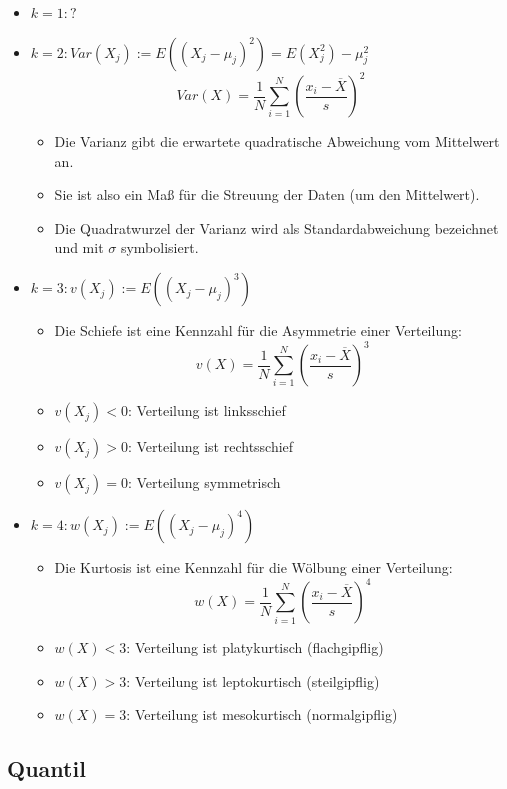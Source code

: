 \documentclass{scrartcl}
\begin{document}
\begin{itemize}
	\item $ k=1:? $
	\item $ k=2:Var(X_j) := E((X_j - \mu_j)^2) = E(X_j^2) - \mu_j^2 $
	\[ Var(X) = \frac{1}{N} \sum_{i=1}^{N} (\frac{x_i - \overline{X}}{s})^2 \]
	\begin{itemize}
		\item Die Varianz gibt die erwartete quadratische Abweichung vom 
		Mittelwert an.
		\item Sie ist also ein Maß für die Streuung der Daten (um den 
		Mittelwert).
		\item Die Quadratwurzel der Varianz wird als Standardabweichung 
		bezeichnet und mit $ \sigma $ symbolisiert.
	\end{itemize}
	\item $ k=3:v(X_j) := E((X_j - \mu_j)^3) $
	\begin{itemize}
		\item Die Schiefe ist eine Kennzahl für die Asymmetrie einer Verteilung:
		\[ v(X) = \frac{1}{N} \sum_{i=1}^{N} (\frac{x_i - \overline{X}}{s})^3 \]
		\item $ v(X_j) < 0 $: Verteilung ist linksschief
		\item $ v(X_j) > 0 $: Verteilung ist rechtsschief
		\item $ v(X_j) = 0 $: Verteilung symmetrisch
	\end{itemize}
	\item $ k=4:w(X_j) := E((X_j - \mu_j)^4) $
	\begin{itemize}
		\item Die Kurtosis ist eine Kennzahl für die Wölbung einer Verteilung:
		\[ w(X) = \frac{1}{N} \sum_{i=1}^{N} (\frac{x_i - \overline{X}}{s})^4 \]
		\item $ w(X) < 3 $: Verteilung ist platykurtisch (flachgipflig)
		\item $ w(X) > 3 $: Verteilung ist leptokurtisch (steilgipflig)
		\item $ w(X) = 3 $: Verteilung ist mesokurtisch (normalgipflig)
	\end{itemize}
\end{itemize}

\subsection{Quantil}
\end{document}

